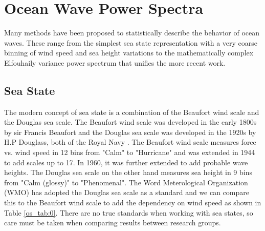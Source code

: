 \section{Ocean Wave Power Spectra}  \label{os_sec:power_spectra}
Many methods have been proposed to statistically describe the behavior of ocean waves. These range from the simplest sea state representation with a very coarse binning of wind speed and sea height variations to the mathematically complex Elfouhaily variance power spectrum that unifies the more recent work.

\subsection {Sea State}
The modern concept of sea state is a combination of the Beaufort wind scale and the Douglas sea scale. The Beaufort wind scale was developed in the early 1800s by sir Francis Beaufort and the Douglas sea scale was developed in the 1920s by H.P Douglass, both of the Royal Navy \cite{uk_met_fact_sheet6}. The Beaufort wind scale measures force vs. wind speed in 12 bins from "Calm" to "Hurricane" and was extended in 1944 to add scales up to 17. In 1960, it was further extended to add probable wave heights. The Douglas sea scale on the other hand measures sea height in 9 bins from "Calm (glossy)" to "Phenomenal". The Word Meterological Organization (WMO) has adopted the Douglas sea scale as a standard \cite{wmo_code} and we can compare this to the Beaufort wind scale to add the dependency on wind speed as shown in Table \ref{os_tab:0}. There are no true standards when working with sea states, so care must be taken when comparing results between research groups.

